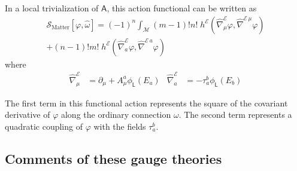 \documentclass[number]{elsarticle}
\theoremstyle{definition}
\theoremstyle{remark}
\numberwithin{equation}{section}
\begin{document}
In a local trivialization of ${{{{\mathbf{\mathsf{{A}}}}}}}$, this action functional can be written as
\begin{multline}
\label{eq-functionalactionmatterdeveloped}
{\mathcal{S}}_\text{Matter}[\varphi,{\widehat{\omega}}] =
(-1)^n \int_{{{{\mathcal{{M}}}}}} (m-1)! n!\; h^{{{{\mathcal{{E}}}}}}({{\widehat{\nabla}}}^{{{{\mathcal{{E}}}}}}_\mu \varphi, {{\widehat{\nabla}}}^{{{{{\mathcal{{E}}}}}}\,\mu} \varphi)
\\
+ (n-1)! m!\; h^{{{{\mathcal{{E}}}}}}({{\widehat{\nabla}}}^{{{{\mathcal{{E}}}}}}_a \varphi, {{\widehat{\nabla}}}^{{{{{\mathcal{{E}}}}}}\,a} \varphi)
\end{multline}
where
\begin{align*}
{{\widehat{\nabla}}}^{{{{\mathcal{{E}}}}}}_\mu &= \partial_\mu + A^a_\mu \phi_{{{{\mathbf{\mathsf{{L}}}}}}}(E_a)
&
{{\widehat{\nabla}}}^{{{{\mathcal{{E}}}}}}_a &= - {\tau}^b_a \phi_{{{{\mathbf{\mathsf{{L}}}}}}}(E_b)
\end{align*}

The first term in this functional action represents the square of the covariant derivative of $\varphi$ along the ordinary connection $\omega$. The second term represents a quadratic coupling of $\varphi$ with the fields ${\tau}^b_a$.

\subsection{Comments of these gauge theories}
\label{subsec-physicalremarks}
\end{document}
